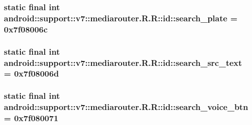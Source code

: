 \hypertarget{classandroid_1_1support_1_1v7_1_1mediarouter_1_1_r_1_1id_3b9346c1625434fd8b1d3bceaa9b973b}{
\subsubsection[{search\_\-plate}]{\setlength{\rightskip}{0pt plus 5cm}static final int android::support::v7::mediarouter.R.R::id::search\_\-plate = 0x7f08006c}}
\label{classandroid_1_1support_1_1v7_1_1mediarouter_1_1_r_1_1id_3b9346c1625434fd8b1d3bceaa9b973b}


\hypertarget{classandroid_1_1support_1_1v7_1_1mediarouter_1_1_r_1_1id_d35b83eb6efa2f654bbc1b1726be393e}{
\subsubsection[{search\_\-src\_\-text}]{\setlength{\rightskip}{0pt plus 5cm}static final int android::support::v7::mediarouter.R.R::id::search\_\-src\_\-text = 0x7f08006d}}
\label{classandroid_1_1support_1_1v7_1_1mediarouter_1_1_r_1_1id_d35b83eb6efa2f654bbc1b1726be393e}


\hypertarget{classandroid_1_1support_1_1v7_1_1mediarouter_1_1_r_1_1id_36323d997e985633cc1d7566801cdead}{
\subsubsection[{search\_\-voice\_\-btn}]{\setlength{\rightskip}{0pt plus 5cm}static final int android::support::v7::mediarouter.R.R::id::search\_\-voice\_\-btn = 0x7f080071}}
\label{classandroid_1_1support_1_1v7_1_1mediarouter_1_1_r_1_1id_36323d997e985633cc1d7566801cdead}


